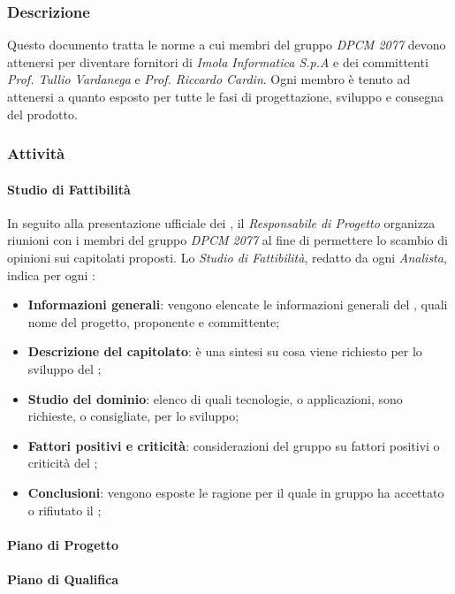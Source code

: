 		\subsubsection{Descrizione}
		Questo documento tratta le norme a cui membri del gruppo \textit{DPCM 2077} devono attenersi per diventare fornitori di \textit{Imola Informatica S.p.A} e dei committenti \textit{Prof. Tullio Vardanega} e \textit{Prof. Riccardo Cardin}. Ogni membro è tenuto ad attenersi a quanto esposto per tutte le fasi di progettazione, sviluppo e consegna del prodotto.
		\subsubsection{Attività}
			\paragraph{Studio di Fattibilità}
			In seguito alla presentazione ufficiale dei , il \textit{Responsabile di Progetto} organizza riunioni con i membri del gruppo \textit{DPCM 2077} al fine di permettere lo scambio di opinioni sui capitolati proposti. Lo \textit{Studio di Fattibilità}, redatto da ogni \textit{Analista}, indica per ogni :
			\begin{itemize}
				\item \textbf{Informazioni generali}: vengono elencate le informazioni generali del , quali nome del progetto, proponente e committente;
				\item \textbf{Descrizione del capitolato}: è una sintesi su cosa viene richiesto per lo sviluppo del ;
				\item \textbf{Studio del dominio}: elenco di quali tecnologie, o applicazioni, sono richieste, o consigliate, per lo sviluppo;
				\item \textbf{Fattori positivi e criticità}: considerazioni del gruppo su fattori positivi o criticità del ;
				\item \textbf{Conclusioni}: vengono esposte le ragione per il quale in gruppo ha accettato o rifiutato il ;
			\end{itemize}
			\paragraph{Piano di Progetto}
			\paragraph{Piano di Qualifica}

